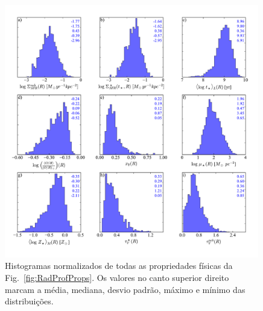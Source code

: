 \begin{figure}
	\centering
	\includegraphics[width=0.99\textwidth]{figuras/histo_props_R.pdf}
	\caption[Histogramas dos perfis radiais das propriedades físicas]
	{Histogramas normalizados de todas as propriedades físicas da Fig.\ \ref{fig:RadProfProps}. Os
valores no canto superior direito marcam a média, mediana, desvio padrão, máximo e mínimo das
distribuições.}
	\label{fig:HistoRadProfProps}
\end{figure}

